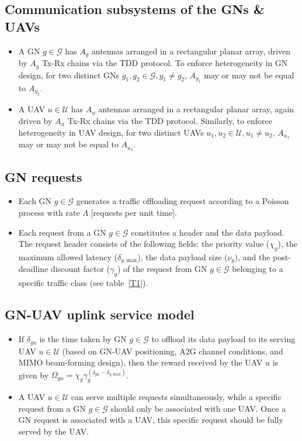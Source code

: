 \documentclass{article}
\begin{document}
\subsection{Communication subsystems of the GNs \& UAVs}
\begin{itemize}
    \item A GN $g{\in}\mathcal{G}$ has $A_{g}$ antennas arranged in a rectangular planar array, driven by $A_{g}$ Tx-Rx chains via the TDD protocol. To enforce heterogeneity in GN design, for two distinct GNs $g_{1},g_{2}{\in}\mathcal{G},g_{1}{\neq}g_{2}$, $A_{g_{1}}$ may or may not be equal to $A_{g_{2}}$.
    \item A UAV $u{\in}\mathcal{U}$ has $A_{u}$ antennas arranged in a rectangular planar array, again driven by $A_{u}$ Tx-Rx chains via the TDD protocol. Similarly, to enforce heterogeneity in UAV design, for two distinct UAVs $u_{1},u_{2}{\in}\mathcal{U},u_{1}{\neq}u_{2}$, $A_{u_{1}}$ may or may not be equal to $A_{u_{2}}$.
\end{itemize}

\subsection{GN requests}
\begin{itemize}
    \item Each GN $g{\in}\mathcal{G}$ generates a traffic offloading request according to a Poisson process with rate $\Lambda$ [requests per unit time].
    \item Each request from a GN $g{\in}\mathcal{G}$ constitutes a header and the data payload. The request header consists of the following fields: the priority value ($\chi_{g}$), the maximum allowed latency ($\delta_{g,\mathrm{max}}$), the data payload size ($\nu_{g}$), and the post-deadline discount factor ($\gamma_{g}$) of the request from GN $g{\in}\mathcal{G}$ belonging to a specific traffic class (see table~\ref{T1}).
\end{itemize}

\subsection{GN-UAV uplink service model}
\begin{itemize}
    \item If $\delta_{gu}$ is the time taken by GN $g{\in}\mathcal{G}$ to offload its data payload to its serving UAV $u{\in}\mathcal{U}$ (based on GN-UAV positioning, A$2$G channel conditions, and MIMO beam-forming design), then the reward received by the UAV $u$ is given by $\Omega_{gu}{=}\chi_{g}\gamma_{g}^{(\delta_{gu}{-}\delta_{g,\mathrm{max}})}$.
    \item A UAV $u{\in}\mathcal{U}$ can serve multiple requests simultaneously, while a specific request from a GN $g{\in}\mathcal{G}$ should only be associated with one UAV. Once a GN request is associated with a UAV, this specific request should be fully served by the UAV.
\end{itemize}
\end{document}

